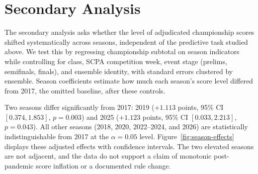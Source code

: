 \section{Secondary Analysis}
\label{sec:secondary}

The secondary analysis asks whether the level of adjudicated championship
scores shifted systematically across seasons, independent of the predictive
task studied above. We test this by regressing championship subtotal on season
indicators while controlling for class, SCPA competition week, event stage
(prelims, semifinals, finals), and ensemble identity, with standard errors
clustered by ensemble. Season coefficients estimate how much each season's
score level differed from 2017, the omitted baseline, after these controls.

Two seasons differ significantly from 2017: 2019 ($+1.113$ points, 95\% CI
$[0.374, 1.853]$, $p = 0.003$) and 2025 ($+1.123$ points, 95\% CI $[0.033,
2.213]$, $p = 0.043$). All other seasons (2018, 2020, 2022--2024, and 2026)
are statistically indistinguishable from 2017 at the $\alpha = 0.05$ level.
Figure~\ref{fig:season-effects} displays these adjusted effects with
confidence intervals. The two elevated seasons are not adjacent, and the data
do not support a claim of monotonic post-pandemic score inflation or a
documented rule change.



